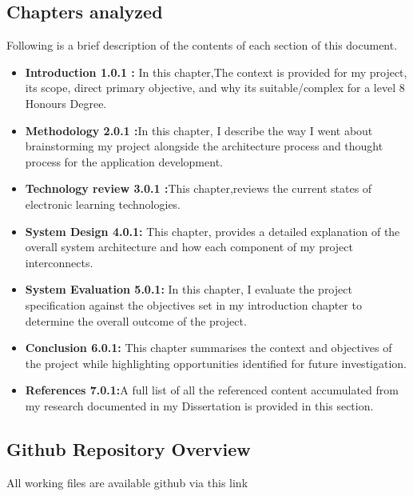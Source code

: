   \subsection{Chapters analyzed}
  
  Following is a brief description of the contents of each section of this document.
  \begin{itemize}
  \item \textbf{Introduction 1.0.1 :}  In this chapter,The context is provided for my project, its scope, direct primary objective, and why its suitable/complex for a  level 8 Honours Degree.
  
  \item  \textbf{Methodology 2.0.1 :}In this chapter, I describe the way I went about brainstorming my project alongside the architecture process and thought process for the application development.
  
  \item  \textbf{Technology review 3.0.1 :}This  chapter,reviews  the current states of electronic learning technologies.
  
  
  \item  \textbf{System Design 4.0.1:}
   This  chapter, provides  a detailed explanation of the overall system architecture and how each component of my project interconnects.
  
  \item  \textbf{System Evaluation 5.0.1:}
  In this chapter, I evaluate the project specification against the objectives set in my introduction chapter to determine  the overall outcome of the project.
  
  
  \item  \textbf{Conclusion 6.0.1:}
   This chapter summarises the context and objectives of the project while highlighting opportunities identified for future investigation.

  
    \item  \textbf{References 7.0.1:}A full list of all the referenced content accumulated from my research documented in my Dissertation is provided in this section.
\end{itemize}
  
  
  
  
   \subsection{Github Repository Overview}
        All working files are available github via this link \cite{githublink}
        
